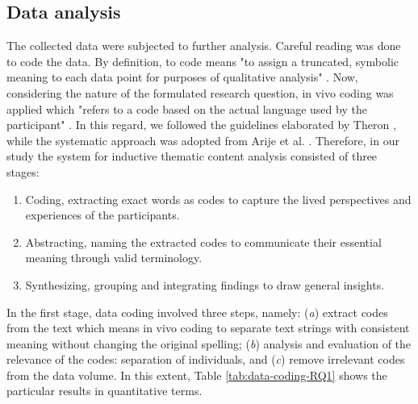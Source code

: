 \documentclass[preprint,12pt,number]{elsarticle}
\begin{document}
\subsection{Data analysis}
The collected data were subjected to further analysis. Careful reading was done to code the data. By definition, to code means "to assign a truncated, symbolic meaning to each data point for purposes of qualitative analysis" \citep{leavy2014oxford}. 
Now, considering the nature of the formulated research question, in vivo coding was applied which "refers to a code based on the actual language used by the participant" \citep{leavy2014oxford}. 
In this regard, we followed the guidelines elaborated by Theron \citep{theron2015coding}, while the systematic approach was adopted from Arije et al. \citep{arije2021synthesizing}. 
Therefore, in our study the system for inductive thematic content analysis consisted of three stages:
\begin{enumerate}
    \item Coding, extracting exact words as codes to capture the lived perspectives and experiences of the participants.
    \item Abstracting, naming the extracted codes to communicate their essential meaning through valid terminology.
    \item Synthesizing, grouping and integrating findings to draw general insights.
\end{enumerate}

In the first stage, data coding involved three steps, namely: (\textit{a}) extract codes from the text which means in vivo coding to separate text strings with consistent meaning without changing the original spelling; (\textit{b}) analysis and evaluation of the relevance of the codes: separation of individuals, and (\textit{c}) remove irrelevant codes from the data volume. In this extent, Table \ref{tab:data-coding-RQ1} shows the particular results in quantitative terms.
\end{document}
